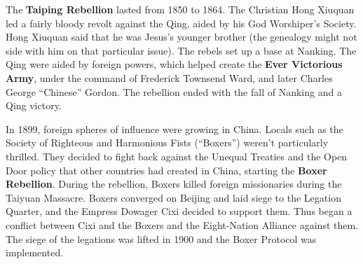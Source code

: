 The \textbf{Taiping Rebellion} lasted from 1850 to 1864.
The Christian Hong Xiuquan led a fairly bloody revolt against the Qing,
aided by his God Worshiper's Society.
Hong Xiuquan said that he was Jesus's younger brother
(the genealogy might not side with him on that particular issue).
The rebels set up a base at Nanking.
The Qing were aided by foreign powers,
which helped create the \textbf{Ever Victorious Army},
under the command of Frederick Townsend Ward, and later Charles George ``Chinese'' Gordon.
The rebellion ended with the fall of Nanking and a Qing victory.

In 1899, foreign spheres of influence were growing in China.
Locals such as the Society of Righteous and Harmonious Fists (``Boxers'')
weren't particularly thrilled.
They decided to fight back against the Unequal Treaties and the Open Door policy
that other countries had created in China, starting the \textbf{Boxer Rebellion}.
During the rebellion, Boxers killed foreign missionaries during the Taiyuan Massacre.
Boxers converged on Beijing and laid siege to the Legation Quarter,
and the Empress Dowager Cixi decided to support them.
Thus began a conflict between Cixi and the Boxers and the Eight-Nation Alliance against them.
The siege of the legations was lifted in 1900 and the Boxer Protocol was implemented.
